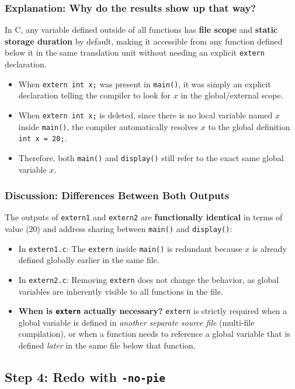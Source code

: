 \documentclass[12pt,a4paper]{article}
\begin{document}
\subsubsection*{Explanation: Why do the results show up that way?}
In C, any variable defined outside of all functions has \textbf{file scope} and \textbf{static storage duration} by default, making it accessible from any function defined below it in the same translation unit without needing an explicit \texttt{extern} declaration.
\begin{itemize}
    \item When \texttt{extern int x;} was present in \texttt{main()}, it was simply an explicit declaration telling the compiler to look for $x$ in the global/external scope.
    \item When \texttt{extern int x;} is deleted, since there is no local variable named $x$ inside \texttt{main()}, the compiler automatically resolves $x$ to the global definition \texttt{int x = 20;}.
    \item Therefore, both \texttt{main()} and \texttt{display()} still refer to the exact same global variable $x$.
\end{itemize}

\subsubsection*{Discussion: Differences Between Both Outputs}
The outputs of \texttt{extern1} and \texttt{extern2} are \textbf{functionally identical} in terms of value ($20$) and address sharing between \texttt{main()} and \texttt{display()}:
\begin{itemize}
    \item In \texttt{extern1.c}: The \texttt{extern} inside \texttt{main()} is redundant because $x$ is already defined globally earlier in the same file.
    \item In \texttt{extern2.c}: Removing \texttt{extern} does not change the behavior, as global variables are inherently visible to all functions in the file.
    \item \textbf{When is \texttt{extern} actually necessary?} \texttt{extern} is strictly required when a global variable is defined in \textit{another separate source file} (multi-file compilation), or when a function needs to reference a global variable that is defined \textit{later} in the same file below that function.
\end{itemize}

\subsection{Step 4: Redo with \texttt{-no-pie}}
\end{document}
